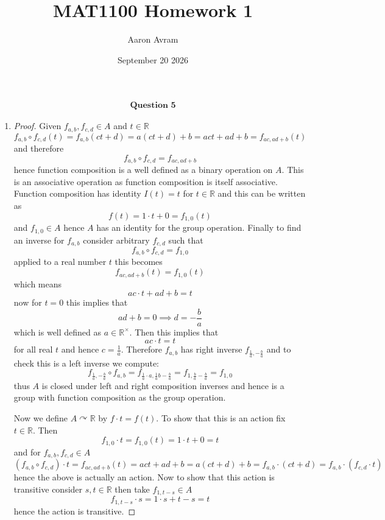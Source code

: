 \documentclass[12pt]{article}
\title{MAT1100 Homework 1}
\author{Aaron Avram}
\date{September 20 2026}
\begin{document}
\newtheorem{definition}{Definition}
\newtheorem{theorem}{Theorem}
\newtheorem{claim}{Claim}
\newtheorem{corollary}{Corollary}

\maketitle

\begin{align*}
    \textbf{Question 5}
\end{align*}

\begin{enumerate}
    \item[(a)]
    \begin{proof}
        Given $f_{a, b}, f_{c, d} \in A$ and $t \in \mathbb R$
        \[ f_{a, b} \circ f_{c, d}(t) = f_{a, b}(ct + d) = a(ct + d) + b = act + ad + b = f_{ac, ad + b}(t) \]
        and therefore
        \[ f_{a, b} \circ f_{c, d} = f_{ac, ad + b} \]
        hence function composition is a well defined as a binary operation on $A$. This is an associative operation as function composition is itself associative. 
        Function composition has identity $I(t) = t$ for $t \in \mathbb R$ and this can be written as
        \[ f(t) = 1 \cdot t + 0 = f_{1, 0}(t) \]
        and $f_{1, 0} \in A$ hence $A$ has an identity for the group operation.
        Finally to find an inverse for $f_{a, b}$ consider arbitrary $f_{c, d}$ such that
        \[ f_{a, b} \circ f_{c, d} = f_{1, 0} \]
        applied to a real number $t$ this becomes
        \[ f_{ac, ad + b}(t) = f_{1, 0}(t) \]
        which means
        \[ ac \cdot t + ad + b = t \]
        now for $t = 0$ this implies that
        \[ ad + b = 0 \implies d = -\frac{b}{a} \]
        which is well defined as $a \in \mathbb R^\times$.
        Then this implies that
        \[ ac \cdot t = t \]
        for all real $t$ and hence $c = \frac{1}{a}$.
        Therefore $f_{a, b}$ has right inverse $f_{\frac{1}{a}, -\frac{b}{a}}$
        and to check this is a left inverse we compute:
        \[ f_{\frac{1}{a}, -\frac{b}{a}} \circ f_{a, b} = f_{\frac{1}{a} \cdot a, \frac{1}{a}b - \frac{b}{a}} = f_{1, \frac{b}{a} - \frac{b}{a}} = f_{1, 0} \]
        thus $A$ is closed under left and right composition inverses and hence is a group with function composition as the group operation.

        Now we define $A \curvearrowright \mathbb R$ by $f \cdot t = f(t)$.
        To show that this is an action fix $t \in \mathbb R$. Then
        \[ f_{1, 0} \cdot t = f_{1, 0}(t) = 1 \cdot t + 0 = t \]
        and for $f_{a, b}, f_{c, d} \in A$
        \[ (f_{a, b} \circ f_{c, d}) \cdot t = f_{ac, ad + b}(t) = act + ad + b = a(ct + d) + b = f_{a, b} \cdot (ct + d) = f_{a, b} \cdot (f_{c, d} \cdot t) \]
        hence the above is actually an action. Now to show that this action is transitive
        consider $s, t \in \mathbb R$ then take $f_{1, t - s} \in A$
        \[ f_{1, t-s} \cdot s = 1 \cdot s + t - s = t \]
        hence the action is transitive.
    \end{proof}


\end{enumerate}
\end{document}
